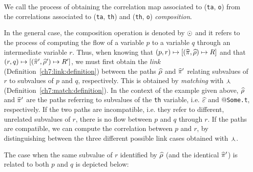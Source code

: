 \documentclass[11pt]{article}
\newcommand{\disp}[1]{\lstinline&#1&}
\begin{document}
We call the process of obtaining the correlation map associated to (\disp{ta}, 
\disp{o}) from the correlations associated to (\disp{ta}, \disp{th}) and 
(\disp{th}, \disp{o}) \emph{composition}.

In the general case, the composition operation is denoted by $\odot$ and it 
refers to the process of computing the flow of a variable $p$ to a variable $q$ 
through an intermediate variable $r$. Thus, when knowing that 
$(p, r) \mapsto [(\widehat{\pi}, \widehat{\rho}) \mapsto R]$ and that 
$(r, q) \mapsto [(\widehat{\pi}', \widehat{\rho}') \mapsto R']$,
we must first obtain the \emph{link} (Definition~\ref{ch7:link:definition})
between the paths $\widehat{\rho}$ and $\widehat{\pi}'$ relating subvalues of $r$ to subvalues of
$p$ and $q$, respectively. This is obtained by \emph{matching} with $\curlywedge$ 
(Definition~\ref{ch7:match:definition}).   
In the context of the example given above, $\widehat{\rho}$ and $\widehat{\pi}'$ are the paths 
referring to subvalues of the {\disp{th}} variable, i.e. $\widehat{\varepsilon}$ and 
$@$\disp{Some.t}, respectively. If the two paths are incompatible, i.e. they
refer to different, unrelated subvalues of $r$, there is no flow between $p$ 
and $q$ through $r$. If the paths are compatible, we can compute the correlation
between $p$ and $r$, by distinguishing between the three different possible link 
cases obtained with $\curlywedge$. 

The case when the same subvalue of $r$ identified by $\widehat{\rho}$ 
(and the identical $\widehat{\pi}'$) is related to both $p$ and $q$ is depicted 
below:
\end{document}
